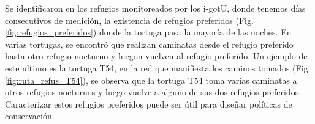 Se identificaron en los refugios monitoreados por los i-gotU, donde tenemos días consecutivos de medición, la existencia de refugios preferidos (Fig. \ref{fig:refugios_preferidos}) donde la tortuga pasa la mayoría de las noches. En varias tortugas, se encontró que realizan caminatas desde el refugio preferido hasta otro refugio nocturno y luegon vuelven al refugio preferido. Un ejemplo de este ultimo es la tortuga T54, en la red que manifiesta los caminos tomados (Fig. \ref{fig:ruta_refus_T54}), se observa que la tortuga T54 toma varias caminatas a otros refugios nocturnos y luego vuelve a alguno de sus dos refugios preferidos. Caracterizar estos refugios preferidos puede ser útil para diseñar políticas de conservación.








 
 